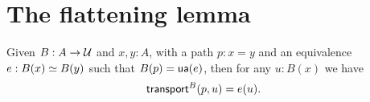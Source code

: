 \documentclass[hott-all.tex]{subfiles}
\begin{document}
% 
% 
% 
\section{The flattening lemma}
% 
% 
% 
\begin{lem}
  Given $B:A\to\mathcal{U}$ and $x,y:A$, with a path $p:x=y$ and an equivalence $e:B(x) \simeq B(y)$ such that ${B}\mathopen{}\left({p}\right)\mathclose{} = \mathsf{ua}(e)$, then for any $u:B(x)$ we have
  \begin{align*}
    \mathsf{transport}^{B}(p,u) &= e(u).
  \end{align*}
\end{lem}
\end{document}
